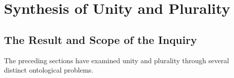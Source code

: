 %
%
%
%
%

\section{Synthesis of Unity and Plurality}
\label{sec:synthesis-of-unity-and-plurality}

\subsection{The Result and Scope of the Inquiry}

The preceding sections have examined
unity and plurality through several
distinct ontological problems.

